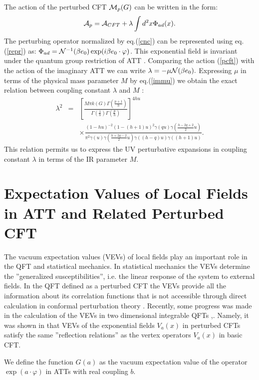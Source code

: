 \documentclass[a4paper,12pt]{article}
\begin{document}
The action of the perturbed CFT ${\cal M}_p(G)$ can be written in the form:
\begin{equation}
{\cal A}_p={\cal A}_{CFT}+\lambda \int d^2x\Phi _{ad}(x).  \label{pcft}
\end{equation}
The perturbing operator normalized by eq.(\ref{cnc}) can be 
represented using eq.(\ref{repr}) as: 
$\Phi _{ad}={\cal N}^{-1}(\beta e_0)\exp (i\beta e_0\cdot \varphi )$. 
This exponential field is
invariant under the quantum group restriction of ATT \cite{RS}. Comparing
the action (\ref{pcft}) with the action of the imaginary ATT we can write 
$\lambda =-\mu {\cal N}(\beta e_0).$ Expressing $\mu $ in terms of the
physical mass parameter $M$ by eq.(\ref{immu}) we obtain the exact relation
between coupling constant $\lambda $ and $M$ \cite{F}:
\begin{eqnarray}
 \lambda ^2 &=&
\left[ \frac{M\pi k(G)\Gamma \left( \frac{p+1}h\right) }{\Gamma 
\left( \frac1h\right)\Gamma \left( \frac ph\right) }\right] ^{4hu} 
\nonumber \\
&& \times
\frac{(1-hu)^{-2}(1-(h+1)u)^2\gamma (qu)\gamma (\frac{h-2q+2}2u)}
{\pi^2\gamma (u)\gamma (\frac{h+2q-2}2u)\gamma ((h-q)u)\gamma ((h+1)u)}. 
\label{lm}
\end{eqnarray}
This relation permits us to express the UV perturbative expansions in
coupling constant $\lambda $ in terms of the IR parameter $M.$

\section{Expectation Values of Local Fields in ATT and Related Perturbed CFT}

The vacuum expectation values (VEVs) of local fields play an important role
in the QFT and statistical mechanics. In statistical mechanics the VEVs
determine the ''generalized susceptibilities'', i.e. the linear response of
the system to external fields. In the QFT defined as a perturbed CFT the
VEVs provide all the information about its correlation functions that is not
accessible through direct calculation in conformal perturbation theory \cite
{ALZM}. Recently, some progress was made in the calculation of the VEVs in
two dimensional integrable QFTs \cite{LZ},\cite{FLZ}. Namely, it was shown
in \cite{FLZ} that VEVs of the exponential fields $V_a(x)$ in perturbed CFTs
satisfy the same ''reflection relations'' as the vertex operators $V_a(x)$
in basic CFT.

We define the function $G(a)$ as the vacuum expectation value of the
operator $\exp (a\cdot \varphi )$ in ATTs with real coupling $b.$
\end{document}
